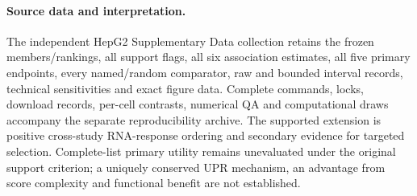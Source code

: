 \documentclass[a4paper,fleqn]{cas-sc}
\makeatletter
\DeclareRobustCommand{\rev}[1]{{\color{red}\def\@citecolor{black}\def\@linkcolor{red}\def\@urlcolor{red}#1}}
\makeatother
\begin{document}
\paragraph{\rev{Source data and interpretation.}}
\rev{The independent HepG2 Supplementary Data collection retains the frozen members/rankings, all support flags, all six association estimates, all five primary endpoints, every named/random comparator, raw and bounded interval records, technical sensitivities and exact figure data.} \rev{Complete commands, locks, download records, per-cell contrasts, numerical QA and computational draws accompany the separate reproducibility archive.} \rev{The supported extension is positive cross-study RNA-response ordering and secondary evidence for targeted selection.} \rev{Complete-list primary utility remains unevaluated under the original support criterion; a uniquely conserved UPR mechanism, an advantage from score complexity and functional benefit are not established.}
\end{document}
